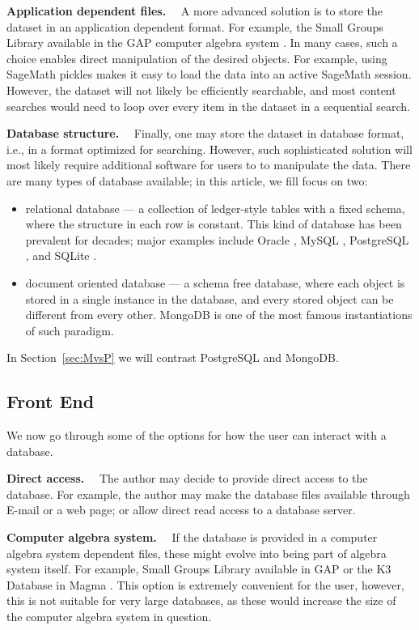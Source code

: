 \documentclass{amsart}
\newcommand{\subhead}[1]{\vspace{0.1in} \noindent \textbf{#1.}\ \ }
\begin{document}
\subhead{Application dependent files}
    A more advanced solution is to store the dataset in an application dependent format.
    For example, the Small Groups Library \cite{smallgroups} available in the GAP computer algebra system \cite{gap}.
    In many cases, such a choice enables direct manipulation of the desired objects.
    For example, using SageMath pickles makes it easy to load the data into an active SageMath session.
    However, the dataset will not likely be efficiently searchable, and most content searches would need to loop over every item in the dataset in a sequential search.

\subhead{Database structure}
    Finally, one may store the dataset in database format, i.e., in a format optimized for searching.
    However, such sophisticated solution will most likely require additional software for users to to manipulate the data.
    There are many types of database available; in this article, we fill focus on two:
    \begin{itemize}
      \item relational database --- a collection of ledger-style tables with a fixed schema, where the structure in each row is constant.
        This kind of database has been prevalent for decades; major examples include Oracle \cite{oracle}, MySQL \cite{mysql}, PostgreSQL \cite{postgres}, and SQLite \cite{sqlite}.
      \item document oriented database --- a schema free database, where each object is stored in a single instance in the database, and every stored object can be different from every other.
        MongoDB \cite{mongo} is one of the most famous instantiations of such paradigm.
    \end{itemize}
    In Section~\ref{sec:MvsP} we will contrast PostgreSQL and MongoDB.


\subsection{Front End}

We now go through some of the options for how the user can interact with a database.

\subhead{Direct access}
    The author may decide to provide direct access to the database.
    For example, the author may make the database files available through E-mail or a web page; or
    allow direct read access to a database server.

\subhead{Computer algebra system}
    If the database is provided in a computer algebra system dependent files, these might evolve into being part of algebra system itself.
    For example, Small Groups Library \cite{smallgroups} available in GAP or the K3 Database in Magma \cite{magmadb}.
    This option is extremely convenient for the user, however, this is not suitable for very large databases, as these would increase the size of the computer algebra system in question.
\end{document}
